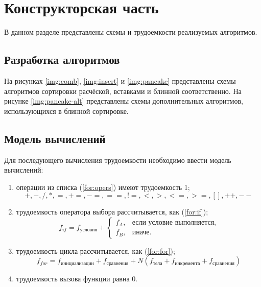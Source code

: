 \chapter{Конструкторская часть}

В данном разделе представлены схемы и трудоемкости реализуемых алгоритмов.

\section{Разработка алгоритмов}

На рисунках \ref{img:comb}, \ref{img:insert} и \ref{img:pancake} представлены схемы алгоритмов сортировки расчёской, вставками и блинной соответственно.
На рисунке \ref{img:pancake-alt} представлены схемы дополнительных алгоритмов, использующихся в блинной сортировке.

\clearpage
{}
\clearpage

\section{Модель вычислений}

Для последующего вычисления трудоемкости необходимо ввести модель вычислений:
\begin{enumerate}
    \item операции из списка (\ref{for:opers}) имеют трудоемкость 1;
        \begin{equation}
            \label{for:opers}
            +, -, /, *, =, +=, -=, ==, !=, <, >, <=, >=, [], ++, {-}-
        \end{equation}
    \item трудоемкость оператора выбора  рассчитывается, как (\ref{for:if});
	\begin{equation}
        \label{for:if}
        f_{if} = f_{\text{условия}} +
        \begin{cases}
        f_A, & \text{если условие выполняется,}\\
        f_B, & \text{иначе.}
        \end{cases}
	\end{equation}
\item трудоемкость цикла рассчитывается, как (\ref{for:for});
    \begin{equation}
        \label{for:for}
        f_{for} = f_{\text{инициализации}} + f_{\text{сравнения}} + N(f_{\text{тела}} + f_{\text{инкремента}} + f_{\text{сравнения}})
    \end{equation}
	\item трудоемкость вызова функции равна 0.
\end{enumerate}


